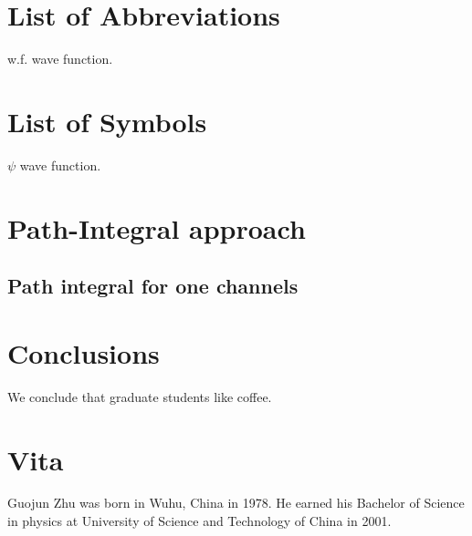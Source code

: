 \documentclass[edeposit,fullpage]{uiucthesis2009}
\begin{document}
\tableofcontents
\listoftables
\listoffigures

\chapter{List of Abbreviations}

\begin{symbollist*}
\item[w.f.] wave function.
\end{symbollist*}

\chapter{List of Symbols}

\begin{symbollist}[0.7in]
\item[$\psi$] wave function.
\end{symbollist}

\mainmatter

\chapter{Path-Integral approach}
\section{Path integral for one channels}




\chapter{Conclusions}

We conclude that graduate students like coffee.

\appendix*

%

\backmatter



\chapter{Vita}

Guojun  Zhu was born in Wuhu, China in 1978.  He earned his Bachelor of Science in physics at University of Science and Technology of China in 2001.  
\end{document}
